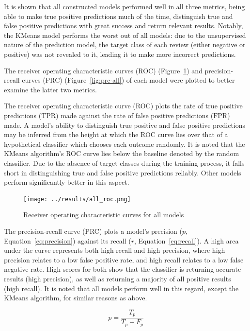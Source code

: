 \documentclass[11pt, a4paper]{pancake-article}
\begin{document}
It is shown that all constructed models performed well in all three
metrics, being
able to make true positive predictions much of the time, distinguish
true and false
positive predictions with great success and return relevant results.
Notably, the KMeans
model performs the worst out of all models: due to the unsupervised
nature of the prediction
model, the target class of each review (either negative or positive)
was not revealed to it,
leading it to make more incorrect predictions.

The receiver operating characteristic curves (ROC)
(Figure~\ref{fig:roc-all}) and precision-recall curves (PRC)
(Figure~\ref{fig:prc-all}) of each model were plotted to better
examine the latter two metrics.

The receiver operating characteristic curve (ROC) plots the rate of
true positive predictions ($\text{TPR}$) made against the
rate of false positive predictions ($\text{FPR}$) made. A model's
ability to distinguish
true positive and false positive predictions may be inferred from the
height at which the ROC curve
lies over that of a hypothetical classifier which chooses each
outcome randomly. It is noted that
the KMeans algorithm's ROC curve lies below the baseline denoted by
the random classifier.
Due to the absence of target classes during the training process, it
falls short in distinguishing
true and false positive predictions reliably. Other models perform
significantly better in this aspect.

\begin{figure}
  \begin{center}
    \texttt{[image: ../results/all\_roc.png]}
  \end{center}
  \caption{Receiver operating characteristic curves for all
  models}\label{fig:roc-all}
\end{figure}

The precision-recall curve (PRC) plots a model's precision ($p$,
Equation~\ref{eq:precision})
against its recall ($r$, Equation~\ref{eq:recall}). A high area under
the curve represents both high recall and high precision, where high
precision relates to a low false positive rate, and high recall
relates to a low false negative rate. High scores for both show that
the classifier is returning accurate results (high precision), as
well as returning a majority of all positive results (high recall).
It is noted that all models perform well in this regard,
except the KMeans algorithm, for similar reasons as above.

\begin{equation}
  p = \frac{T_p}{T_p + F_p}
  \label{eq:precision}
\end{equation}
\end{document}
